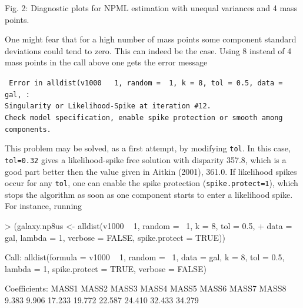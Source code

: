 \documentclass[a4paper]{article}
\begin{document}
\begin{landscape}
\begin{minipage}{21cm}
Fig. 2:  Diagnostic plots for NPML estimation with unequal variances and 4 mass points.  
\end{minipage}


One might fear that for a high number of mass points some component  standard deviations could tend to zero. 
This can indeed be the case.  Using  8 instead of 4  mass points in the call above one gets the error message


\vspace{0.3cm}
{\tt 
\noindent  Error in alldist(v1000 ~ 1, random = ~1, k = 8, tol = 0.5, data = gal,  :\\
\indent    Singularity or Likelihood-Spike at iteration \#12.  \\
\indent\indent     Check model specification,  enable spike protection or smooth among components.  \\
}




This problem may be solved,  as a first attempt, by modifying {\tt tol}. In this case, {\tt tol=0.32} 
gives a likelihood-spike free solution with disparity  357.8, which is a good part better then the value given in Aitkin (2001), 361.0. 
If likelihood spikes occur for any {\tt tol}, one can enable the spike protection ({\tt spike.protect=1}), which stops the algorithm as soon
as one component starts to enter a likelihood spike.  For instance, running

\begin{Schunk}
\begin{Sinput}
> (galaxy.np8us <- alldist(v1000 ~ 1, random = ~1, k = 8, tol = 0.5, 
+     data = gal, lambda = 1, verbose = FALSE, spike.protect = TRUE))
\end{Sinput}
\begin{Soutput}
Call:  alldist(formula = v1000 ~ 1, random = ~1, data = gal, k = 8,      tol = 0.5, lambda = 1, spike.protect = TRUE, verbose = FALSE) 

Coefficients:
 MASS1   MASS2   MASS3   MASS4   MASS5   MASS6   MASS7   MASS8  
 9.383   9.906  17.233  19.772  22.587  24.410  32.433  34.279  


\end{Soutput}
\end{Schunk}
\end{landscape}
\end{document}
